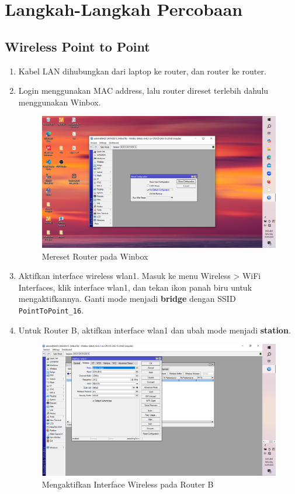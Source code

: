 \section{Langkah-Langkah Percobaan}
\subsection{Wireless Point to Point}
\begin{enumerate}
    \item Kabel LAN dihubungkan dari laptop ke router, dan router ke router.
    \item Login menggunakan MAC address, lalu router direset terlebih dahulu menggunakan Winbox.
    \begin{figure}[H]
        \centering
        \includegraphics[width=0.5\linewidth]{gambar1.png}
        \caption{Mereset Router pada Winbox}
        \label{fig:reset-router}
    \end{figure}

    \item Aktifkan interface wireless wlan1. Masuk ke menu Wireless > WiFi Interfaces, klik interface wlan1, dan tekan ikon panah biru untuk mengaktifkannya. Ganti mode menjadi \textbf{bridge} dengan SSID \texttt{PointToPoint\_16}.

    \item Untuk Router B, aktifkan interface wlan1 dan ubah mode menjadi \textbf{station}.
    \begin{figure}[H]
        \centering
        \includegraphics[width=0.5\linewidth]{gambar3a.png}
        \caption{Mengaktifkan Interface Wireless pada Router B}
        \label{fig:aktif-wlan-b}
    \end{figure}


\end{enumerate}
